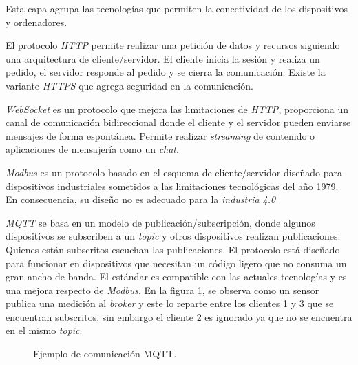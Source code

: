 		Esta capa agrupa las tecnologías que permiten la conectividad de los dispositivos y ordenadores.
		
		El protocolo \emph{HTTP} permite realizar una petición de datos y recursos siguiendo una arquitectura de cliente/servidor. El cliente inicia la sesión y realiza un pedido, el servidor responde al pedido y se cierra la comunicación. Existe la variante \emph{HTTPS} que agrega seguridad en la comunicación.
		
		\emph{WebSocket} es un protocolo que mejora las limitaciones de \emph{HTTP}, proporciona un canal de comunicación bidireccional donde el cliente y el servidor pueden enviarse mensajes de forma espontánea. Permite realizar \emph{streaming} de contenido o aplicaciones de mensajería como un \emph{chat}.
		
		\emph{Modbus} es un protocolo basado en el esquema de cliente/servidor diseñado para dispositivos industriales sometidos a las limitaciones tecnológicas del año 1979. En consecuencia, su diseño no es adecuado para la \emph{industria 4.0}
		
		\emph{MQTT} se basa en un modelo de publicación/subscripción, donde algunos dispositivos se subscriben a un \emph{topic} y otros dispositivos realizan publicaciones. Quienes están subscritos escuchan las publicaciones. El protocolo está diseñado para funcionar en dispositivos que necesitan un código ligero que no consuma un gran ancho de banda. El estándar es compatible con las actuales tecnologías y es una mejora respecto de \emph{Modbus}. En la figura \ref{fig:mqttEjemplo}, se observa como un sensor publica una medición al \emph{broker} y este lo reparte entre los clientes 1 y 3 que se encuentran subscritos, sin embargo el cliente 2 es ignorado ya que no se encuentra en el mismo \emph{topic}.
						
			\begin{figure}[h]
				\centering
				\caption{Ejemplo de comunicación MQTT.}
				\label{fig:mqttEjemplo}
			\end{figure}
	
